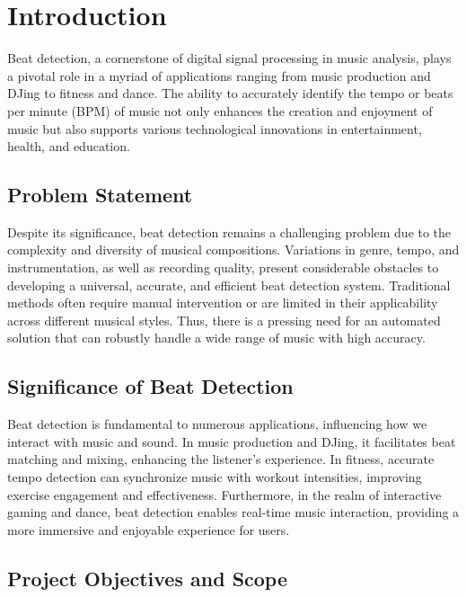 \section{Introduction}

Beat detection, a cornerstone of digital signal processing in music analysis, plays a pivotal role in a myriad of applications ranging from music production and DJing to fitness and dance. The ability to accurately identify the tempo or beats per minute (BPM) of music not only enhances the creation and enjoyment of music but also supports various technological innovations in entertainment, health, and education.

\subsection{Problem Statement}

Despite its significance, beat detection remains a challenging problem due to the complexity and diversity of musical compositions. Variations in genre, tempo, and instrumentation, as well as recording quality, present considerable obstacles to developing a universal, accurate, and efficient beat detection system. Traditional methods often require manual intervention or are limited in their applicability across different musical styles. Thus, there is a pressing need for an automated solution that can robustly handle a wide range of music with high accuracy.

\subsection{Significance of Beat Detection}

Beat detection is fundamental to numerous applications, influencing how we interact with music and sound. In music production and DJing, it facilitates beat matching and mixing, enhancing the listener's experience. In fitness, accurate tempo detection can synchronize music with workout intensities, improving exercise engagement and effectiveness. Furthermore, in the realm of interactive gaming and dance, beat detection enables real-time music interaction, providing a more immersive and enjoyable experience for users.

\subsection{Project Objectives and Scope}

